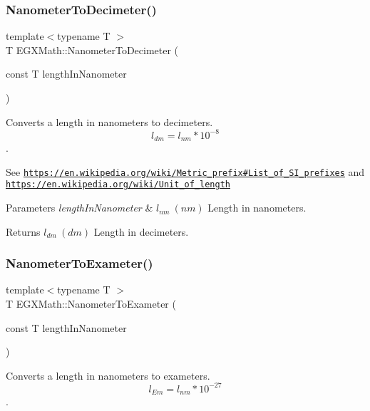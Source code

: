 \subsubsection{\texorpdfstring{Nanometer\+To\+Decimeter()}{NanometerToDecimeter()}}
{\footnotesize\ttfamily template$<$typename T $>$ \\
T E\+G\+X\+Math\+::\+Nanometer\+To\+Decimeter (\begin{DoxyParamCaption}\item[{const T}]{length\+In\+Nanometer }\end{DoxyParamCaption})}



Converts a length in nanometers to decimeters. \[ l_{dm}=l_{nm} * 10^{-8} \]. 

See \href{https://en.wikipedia.org/wiki/Metric_prefix#List_of_SI_prefixes}{\tt https\+://en.\+wikipedia.\+org/wiki/\+Metric\+\_\+prefix\#\+List\+\_\+of\+\_\+\+S\+I\+\_\+prefixes} and \href{https://en.wikipedia.org/wiki/Unit_of_length}{\tt https\+://en.\+wikipedia.\+org/wiki/\+Unit\+\_\+of\+\_\+length} 
\begin{DoxyParams}{Parameters}
{\em length\+In\+Nanometer} & $ l_{nm}\ (nm)$ Length in nanometers. \\
\hline
\end{DoxyParams}
\begin{DoxyReturn}{Returns}
$ l_{dm}\ (dm)$ Length in decimeters. 
\end{DoxyReturn}
\mbox{\label{group___e_g_x_math-_conversions-_length_conversions-_nanometer-_s_i_ga27316ac700548a2bcf058bb4f098f4e2}} 
\subsubsection{\texorpdfstring{Nanometer\+To\+Exameter()}{NanometerToExameter()}}
{\footnotesize\ttfamily template$<$typename T $>$ \\
T E\+G\+X\+Math\+::\+Nanometer\+To\+Exameter (\begin{DoxyParamCaption}\item[{const T}]{length\+In\+Nanometer }\end{DoxyParamCaption})}



Converts a length in nanometers to exameters. \[ l_{Em}=l_{nm} * 10^{-27} \]. 

